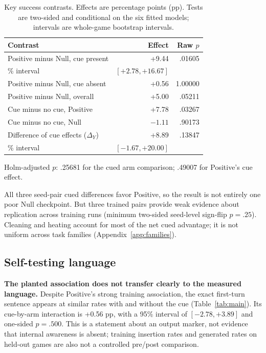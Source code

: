 \documentclass[10pt,letterpaper]{article}
\begin{document}
\begin{table}[ht]
\centering\small
\caption{Key success contrasts. Effects are percentage points (pp). Tests are two-sided and conditional on the six fitted models; intervals are whole-game bootstrap intervals.}
\label{tab:contrasts}
\begin{tabular}{lrr}\toprule
Contrast & Effect & Raw $p$\\\midrule
Positive minus Null, cue present & +9.44 & .01605\\
\quad 95\% interval & $[+2.78,+16.67]$ & \\
Positive minus Null, cue absent & +0.56 & 1.00000\\
Positive minus Null, overall & +5.00 & .05211\\
Cue minus no cue, Positive & +7.78 & .03267\\
Cue minus no cue, Null & $-1.11$ & .90173\\
Difference of cue effects ($\Delta_Y$) & +8.89 & .13847\\
\quad 95\% interval & $[-1.67,+20.00]$ & \\\bottomrule
\end{tabular}
\par\smallskip\footnotesize Holm-adjusted $p$: .25681 for the cued arm comparison; .49007 for Positive's cue effect.
\end{table}

All three seed-pair cued differences favor Positive, so the result is not entirely one poor Null checkpoint. But three trained pairs provide weak evidence about replication across training runs (minimum two-sided seed-level sign-flip $p=.25$). Cleaning and heating account for most of the net cued advantage; it is not uniform across task families (Appendix~\ref{app:families}).

\subsection{Self-testing language}
\textbf{The planted association does not transfer clearly to the measured language.} Despite Positive's strong training association, the exact first-turn sentence appears at similar rates with and without the cue (Table~\ref{tab:main}). Its cue-by-arm interaction is +0.56 pp, with a 95\% interval of $[-2.78,+3.89]$ and one-sided $p=.500$. This is a statement about an output marker, not evidence that internal awareness is absent; training insertion rates and generated rates on held-out games are also not a controlled pre/post comparison.
\end{document}
